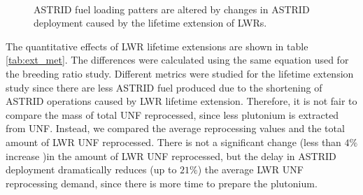 \begin{figure}[!ht]
	\centering
	\quad
	\\
	\quad
	\caption{\gls{ASTRID} fuel loading patters are altered by changes in \gls{ASTRID} deployment
			 caused by the lifetime extension of \glspl{LWR}.}
	\label{fig:ext_fuel}
\end{figure}

The quantitative effects of
\gls{LWR} lifetime extensions are shown in table \ref{tab:ext_met}.
The differences were calculated using the same equation used for the
breeding ratio study. Different metrics were studied for the lifetime
extension study since there are less \gls{ASTRID} fuel produced due to
the shortening of \gls{ASTRID} operations caused by \gls{LWR} lifetime
extension. Therefore, it is not fair to compare the mass of total \gls{UNF} reprocessed,
since less plutonium is extracted from \gls{UNF}. Instead, we compared the
average reprocessing values and the total amount of \gls{LWR} \gls{UNF} reprocessed.
There is not a significant change (less than $4\%$ increase )in the amount of \gls{LWR}
\gls{UNF} reprocessed, but the delay in \gls{ASTRID} deployment
dramatically reduces (up to $21\%$) the average \gls{LWR} \gls{UNF} reprocessing demand, since there is
more time to prepare the plutonium.

